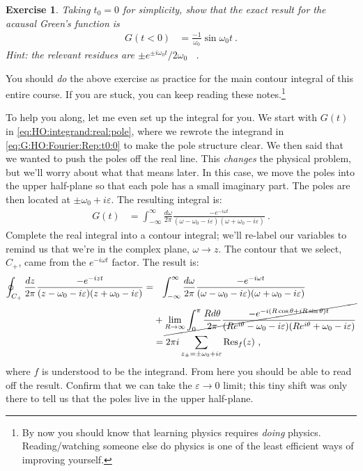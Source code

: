\documentclass[
  11pt,
	colorful,
	raggedright,
]{tufte-style-thesis-flip}
\newtheorem{exercise}{Exercise}[section]
\begin{document}
\begin{exercise}
Taking $t_0=0$ for simplicity, show that the exact result for the acausal Green's function is
\begin{align}
  G(t<0) &= \frac{-1}{\omega_0}\sin\omega_0t \ .
  \label{eq:HO:G:t:less:0:nonzero}
\end{align}
Hint: the relevant residues are $\pm e^{\pm i\omega_0t}/2\omega_0$ \ .
\end{exercise}
You should \emph{do} the above exercise as practice for the main contour integral of this entire course. If you are stuck, you can keep reading these notes.\footnote{By now you should know that learning physics requires \emph{doing} physics. Reading/watching someone else do physics is one of the least efficient ways of improving yourself.} 

To help you along, let me even set up the integral for you. We start with $G(t)$ in \eqref{eq:HO:integrand:real:pole}, where we rewrote the integrand in \eqref{eq:G:HO:Fourier:Rep:t0:0} to make the pole structure clear. We then said that we wanted to push the poles off the real line. This \emph{changes} the physical problem, but we'll worry about what that means later. In this case, we move the poles into the upper half-plane so that each pole has a small imaginary part. The poles are then located at $\pm \omega_0 + i \varepsilon$. The resulting integral is:
\begin{align}
  G(t) &= 
  \int_{-\infty}^\infty \frac{d\omega}{2\pi} 
  \frac{-e^{-i\omega t}}{(\omega - \omega_0-i\varepsilon)(\omega + \omega_0-i\varepsilon)} 
  \ .
\end{align}
Complete the real integral into a contour integral; we'll re-label our variables to remind us that we're in the complex plane, $\omega\to z$. The contour that we select, $C_+$, came from the $e^{-i\omega t}$ factor. The result is:
\begin{align}
  \oint_{C_+}
  \frac{dz}{2\pi} 
  \frac{-e^{-iz t}}{(z - \omega_0-i\varepsilon)(z + \omega_0-i\varepsilon)}
  =&\phantom{+} 
  \int_{-\infty}^\infty \frac{d\omega}{2\pi} 
  \frac{-e^{-i\omega t}}{(\omega - \omega_0-i\varepsilon)(\omega + \omega_0-i\varepsilon)} 
  \nonumber
  \\
  &
  + 
  \cancel{
  \lim_{R\to\infty} \int_{0}^\pi \frac{Rd\theta}{2\pi} 
  \frac{-e^{-i(R\cos\theta + i R\sin\theta)t}}{(Re^{i\theta} - \omega_0-i\varepsilon)(Re^{i\theta} + \omega_0-i\varepsilon)} 
  }
  \label{eq:HO:G:integral:adv:1}
  \\
  &=
  2\pi i \sum_{z_\pm=\pm\omega_0+i\varepsilon} \text{Res}_f(z) \ ,
  \label{eq:HO:G:integral:adv:2}
\end{align}
where $f$ is understood to be the integrand. 
%
From here you should be able to read off the result. Confirm that we can take the $\varepsilon\to 0$ limit; this tiny shift was only there to tell us that the poles live in the upper half-plane.
\end{document}
